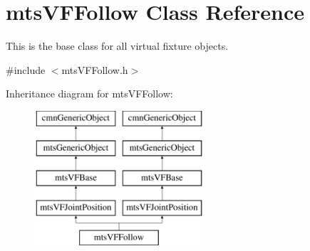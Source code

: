 \hypertarget{classmts_v_f_follow}{\section{mts\-V\-F\-Follow Class Reference}
\label{classmts_v_f_follow}
}


This is the base class for all virtual fixture objects.  




{\ttfamily \#include $<$mts\-V\-F\-Follow.\-h$>$}

Inheritance diagram for mts\-V\-F\-Follow\-:\begin{figure}[H]
\begin{center}
\leavevmode
\includegraphics[height=5.000000cm]{df/dfa/classmts_v_f_follow}
\end{center}
\end{figure}
